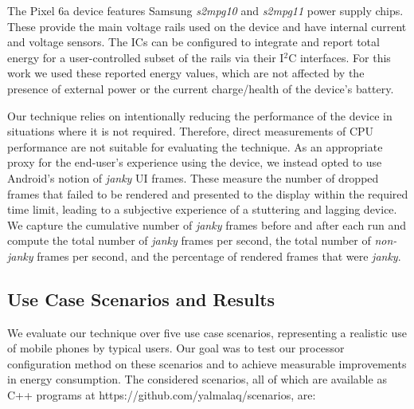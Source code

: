 \documentclass[conference]{IEEEtran}
\begin{document}
The Pixel 6a device features Samsung \emph{s2mpg10} and \emph{s2mpg11} power supply chips. These provide the main voltage rails used on the device and have internal current and voltage sensors. The ICs can be configured to integrate and report total energy for a user-controlled subset of the rails via their I$^2$C interfaces. For this work we used these reported energy values, which are not affected by the presence of external power or the current charge/health of the device's battery.

Our technique relies on intentionally reducing the performance of the device in situations where it is not required. Therefore, direct measurements of CPU performance are not suitable for evaluating the technique. As an appropriate proxy for the end-user's experience using the device, we instead opted to use Android's notion of \emph{janky} UI frames. These measure the number of dropped frames that failed to be rendered and presented to the display within the required time limit, leading to a subjective experience of a stuttering and lagging device. We capture the cumulative number of \emph{janky} frames before and after each run and compute the total number of \emph{janky} frames per second, the total number of \emph{non-janky} frames per second, and the percentage of rendered frames that were \emph{janky}.

\subsection{Use Case Scenarios and Results} \label{sec:scenarios}
We evaluate our technique over five use case scenarios, representing a realistic use of mobile phones by typical users. Our goal was to test our processor configuration method on these scenarios and to achieve measurable improvements in energy consumption. The considered scenarios, all of which are available as C++ programs at https://github.com/yalmalaq/scenarios, are:
\end{document}
